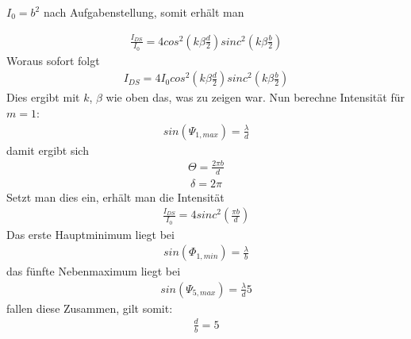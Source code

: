 \documentclass[a4paper,10pt]{scrartcl}
\begin{document}
\(I_{0}=b^{2}\) nach Aufgabenstellung, somit erhält man

\begin{align*}
\frac{I_{DS}}{I_{0}}=4cos^{2}(k\beta \frac{d}{2})sinc^{2}(k\beta\frac{b}{2})
\end{align*}
Woraus sofort folgt
\begin{align*}
I_{DS}=4I_{0}cos^{2}(k\beta \frac{d}{2})sinc^{2}(k\beta\frac{b}{2})
\end{align*}
Dies ergibt mit \(k\), \(\beta\) wie oben das, was zu zeigen war.
Nun berechne Intensität für \(m=1\):
\begin{align*}
sin(\Psi_{1,max})=\frac{\lambda}{d}
\end{align*}
damit ergibt sich
\begin{align*}
\Theta=\frac{2\pi b}{d}
\end{align*}
\begin{align*}
\delta=2\pi
\end{align*}
Setzt man dies ein, erhält man die Intensität
\begin{align*}
\frac{I_{DS}}{I_{0}}=4sinc^{2}(\frac{\pi b}{d})
\end{align*}
Das erste Hauptminimum liegt bei 
\begin{align*}
sin(\Phi_{1,min})=\frac{\lambda}{b}
\end{align*}
das fünfte Nebenmaximum liegt bei
\begin{align*}
sin(\Psi_{5,max})=\frac{\lambda}{d}5
\end{align*}
fallen diese Zusammen, gilt somit:
\begin{align*}
\frac{d}{b}=5
\end{align*}
\end{document}
